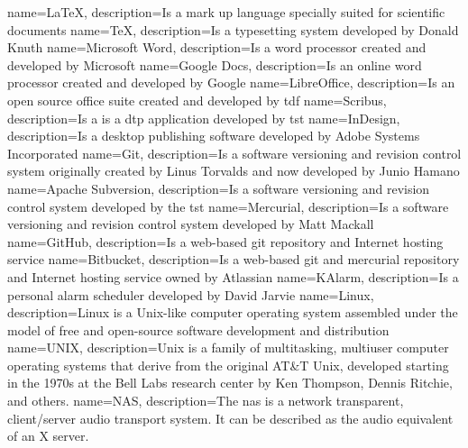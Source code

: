 {
    name=\LaTeX,
    description={Is a mark up language specially suited for scientific documents}
}
{
    name=\TeX,
    description={Is a typesetting system developed by Donald Knuth}
}
{
    name={Microsoft Word},
    description={Is a word processor created and developed by Microsoft}
}
{
    name={Google Docs},
    description={Is an online word processor created and developed by Google}
}
{
    name=LibreOffice,
    description={Is an open source office suite created and developed by \acrlong{tdf}}
}
{
    name=Scribus,
    description={Is a is a \acrlong{dtp} application developed by \acrlong{tst}}
}
{
    name=InDesign,
    description={Is a desktop publishing software developed by Adobe Systems Incorporated}
}
{
    name=Git,
    description={Is a software versioning and revision control system originally created by Linus Torvalds and now developed by Junio Hamano}
}
{
    name={Apache Subversion},
    description={Is a software versioning and revision control system developed by the \acrlong{tst}}
}
{
    name=Mercurial,
    description={Is a software versioning and revision control system developed by Matt Mackall}
}
{
    name=GitHub,
    description={Is a web-based \gls{git} repository and Internet hosting service}
}
{
    name=Bitbucket,
    description={Is a web-based \gls{git} and \gls{mercurial} repository and Internet hosting service owned by Atlassian}
}
{
    name=KAlarm,
    description={Is a personal alarm scheduler developed by David Jarvie}
}
{
    name=Linux,
    description={Linux is a Unix-like computer operating system assembled under the model of free and open-source software development and distribution}
}
{
    name=UNIX,
    description={Unix is a family of multitasking, multiuser computer operating systems that derive from the original AT\&T Unix, developed starting in the 1970s at the Bell Labs research center by Ken Thompson, Dennis Ritchie, and others.}
}
{
    name=NAS,
    description={The \acrlong{nas} is a network transparent, client/server audio transport system. It can be described as the audio equivalent of an X server.}
}
